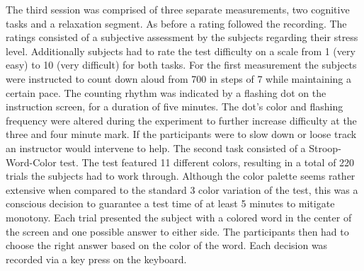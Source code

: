 The third session was comprised of three separate measurements, two cognitive tasks and a relaxation segment. As before a rating followed the recording. The ratings consisted of a subjective assessment by the subjects regarding their stress level. Additionally subjects had to rate the test difficulty on a scale from 1 (very easy) to 10 (very difficult) for both tasks. 
For the first measurement the subjects were instructed to count down aloud from 700 in steps of 7 while maintaining a certain pace. The counting rhythm was indicated by a flashing dot on the instruction screen, for a duration of five minutes. The dot's color and flashing frequency were altered during the experiment to further increase difficulty at the three and four minute mark. If the participants were to slow down or loose track an instructor would intervene to help.
The second task consisted of a Stroop-Word-Color test. The test featured 11 different colors, resulting in a total of 220 trials the subjects had to work through. Although the color palette seems rather extensive when compared to the standard 3 color variation of the test, this was a conscious decision to guarantee a test time of at least 5 minutes to mitigate monotony. Each trial presented the subject with a colored word in the center of the screen and one possible answer to either side. The participants then had to choose the right answer based on the color of the word. Each decision was recorded via a key press on the keyboard. 


